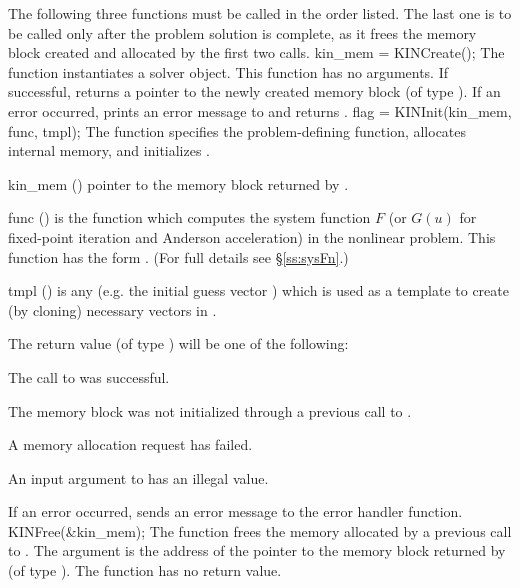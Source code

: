 The following three functions must be called in the order listed. The last one
is to be called only after the problem solution is complete, as it frees the
{\kinsol} memory block created and allocated by the first two calls.
{
  kin\_mem = KINCreate();
}
{
  The function  instantiates a {\kinsol} solver object.
}
{
  This function has no arguments.
}
{
  If successful,  returns a pointer to the newly created 
  {\kinsol} memory block (of type ).
  If an error occurred,  prints an error message to 
  and returns .
}
{}
{
flag = KINInit(kin\_mem, func, tmpl);
}
{
  The function  specifies the problem-defining
  function, allocates internal memory, and initializes {\kinsol}.
}
{
  \begin{args}
  \item[kin\_mem] ()
    pointer to the {\kinsol} memory block returned by .
  \item[func] ()
    is the {\C} function which computes the system function $F$ 
    (or $G(u)$ for fixed-point iteration and Anderson acceleration) in the nonlinear
    problem.  This function has the form . 
    (For full details see \S\ref{ss:sysFn}.)
  \item[tmpl] ()
    is any  (e.g. the initial guess vector ) which is used
    as a template to create (by cloning) necessary vectors in .
  \end{args}
}
{
  The return value  (of type ) will be one of the following:
  \begin{args}
  \item[\Id{KIN\_SUCCESS}]
    The call to  was successful.
  \item[\Id{KIN\_MEM\_NULL}] 
    The {\kinsol} memory block was not initialized through a previous call
    to .
  \item[\Id{KIN\_MEM\_FAIL}] 
    A memory allocation request has failed.
  \item[\Id{KIN\_ILL\_INPUT}] 
    An input argument to  has an illegal value.
  \end{args}
}
{
  If an error occurred,  sends an error message to the
  error handler function.
}
{
  KINFree(\&kin\_mem);
}
{
  The function  frees the memory allocated by
  a previous call to .
}
{
  The argument is the address of the pointer to the {\kinsol} memory block
  returned by  (of type ).
}
{
  The function  has no return value.
}
{}

